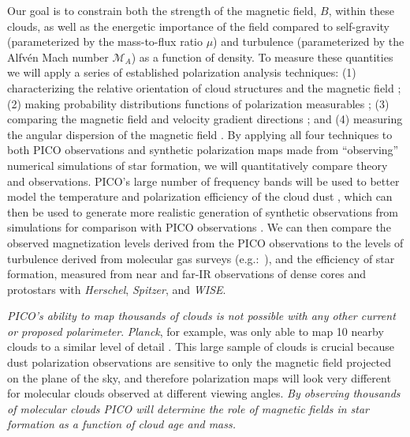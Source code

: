 \documentclass[PICOReport.tex]{subfiles}
\begin{document}
Our goal is to constrain both the strength of the magnetic field, $B$, within these clouds, as well as the energetic importance of the field compared to self-gravity (parameterized by the mass-to-flux ratio $\mu$) and turbulence (parameterized by the Alfv\'{e}n Mach number $\mathcal{M}_A$) as a function of density.
To measure these quantities we will apply a series of established polarization analysis techniques:
(1) characterizing the relative orientation of cloud structures and the magnetic field \citep{Soler2013,Chen2016,Soler2017,Planck:XXXV}; (2) making probability distributions functions of polarization measurables \citep{Fissel2016, King2018}; (3) comparing the magnetic field and velocity gradient directions \citep{GonzalezCasanova2017,Yuen2017,Lazarian2018}; and (4) measuring the angular dispersion of the magnetic field  \citep{Davis1951,Chandrasekhar1953, Hildebrand2009,Houde2009}.
By applying all four techniques to both PICO observations and synthetic polarization maps made from ``observing'' numerical simulations of star formation, we will quantitatively compare theory and observations. PICO's large number of frequency bands will be used to better model the temperature and polarization efficiency of the cloud dust  \citep{Andersson2015}, which can then be used to generate more realistic generation of synthetic observations from simulations for comparison with PICO observations \citep{Seifried2018}. We can then compare the observed magnetization levels derived from the PICO observations to the levels of turbulence derived from molecular gas surveys (e.g.:~\citealt{EllsworthBowers2015, Miville-Deschenes2017}), and the efficiency of star formation, measured from near and far-IR observations of dense cores and protostars with {\em Herschel}, {\em Spitzer}, and {\em WISE}. 

{\em PICO's ability to map thousands of clouds is not possible with any other current or proposed polarimeter}. {\em Planck}, for example, was only able to map 10 nearby clouds to a similar level of detail \citep{Planck:XXXV}. This large sample of clouds is crucial because dust polarization observations are sensitive to only the magnetic field projected on the plane of the sky, and therefore polarization maps will look very different for molecular clouds observed at different viewing angles.  {\em By observing thousands of molecular clouds PICO will determine the role of magnetic fields in star formation as a function of cloud age and mass.}
\end{document}
